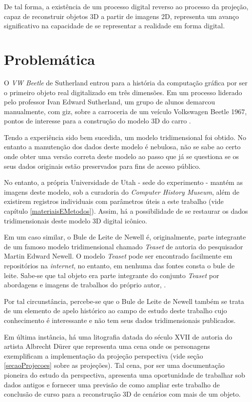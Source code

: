 	De tal forma, a existência de um processo digital reverso ao processo da projeção, capaz de reconstruir objetos 3D a partir de imagens 2D, representa um avanço significativo na capacidade de se representar a realidade em forma digital.
	
\section{Problemática}

	O \textit{VW Beetle} de Sutherland entrou para a história da computação gráfica por ser o primeiro objeto real digitalizado em três dimensões. Em um processo liderado pelo professor Ivan Edward Sutherland, um grupo de alunos demarcou manualmente, com giz, sobre a carroceria de um veículo Volkswagen Beetle 1967, pontos de interesse para a construção do modelo 3D do carro \cite{MappingSutherlandVW}.
	
	Tendo a experiência sido bem sucedida, um modelo tridimensional foi obtido. No entanto a manutenção dos dados deste modelo é nebulosa, não se sabe ao certo onde obter uma versão correta deste modelo ao passo que já se questiona se os seus dados originais estão preservados para fins de acesso público.
	
	No entanto, a própria Universidade de Utah - sede do experimento - mantém as imagens deste modelo, sob a curadoria do \textit{Computer History Museum}, além de existirem registros individuais com parâmetros úteis a este trabalho (vide capítulo \ref{materiaisEMetodos}). Assim, há a possibilidade de se restaurar os dados tridimensionais deste modelo 3D digital icônico.
	
	Em um caso similar, o Bule de Leite de Newell é, originalmente, parte integrante de um famoso modelo tridimensional chamado \textit{Teaset} de autoria do pesquisador Martin Edward Newell. O modelo \textit{Teaset} pode ser encontrado facilmente em repositórios na \textit{internet}, no entanto, em nenhuma das fontes consta o bule de leite. Sabe-se que tal objeto era parte integrante do conjunto \textit{Teaset} por abordagens e imagens de trabalhos do próprio autor, \cite{newellResearch}. 
	
	Por tal circunstância, percebe-se que o Bule de Leite de Newell também se trata de um elemento de apelo histórico ao campo de estudo deste trabalho cujo conhecimento é interessante e não tem seus dados tridimensionais publicados.
	
	Em última instância, há uma litografia datada do século XVII de autoria do artista Albrecht Dürer que representa uma cena onde os personagens exemplificam a implementação da projeção perspectiva (vide seção \ref{secaoProjecoes} sobre as projeções). Tal cena, por ser uma documentação pioneira do estudo da perspectiva, apresenta uma oportunidade de trabalhar sob dados antigos e fornecer uma previsão de como ampliar este trabalho de conclusão de curso para a reconstrução 3D de cenários com mais de um objeto.
	
